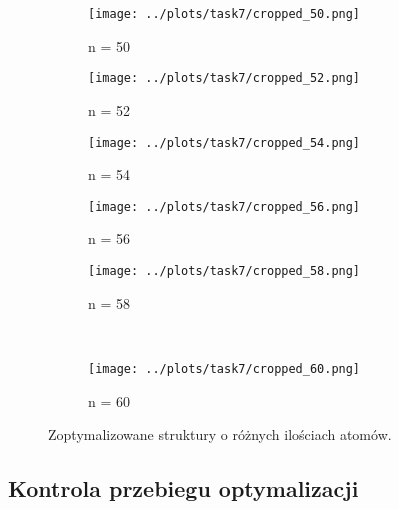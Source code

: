 \documentclass[a4paper,12pt]{article}
\begin{document}
\begin{figure}[H]
\begin{subfigure}{0.19\textwidth}
			\centering 
			\texttt{[image: ../plots/task7/cropped\_50.png]}
			\caption{n = 50}
		\end{subfigure}
		\begin{subfigure}{0.19\textwidth}
			\centering 
			\texttt{[image: ../plots/task7/cropped\_52.png]}
			\caption{n = 52}
		\end{subfigure}
		\begin{subfigure}{0.19\textwidth}
			\centering 
			\texttt{[image: ../plots/task7/cropped\_54.png]}
			\caption{n = 54}
		\end{subfigure}
		\begin{subfigure}{0.19\textwidth}
			\centering 
			\texttt{[image: ../plots/task7/cropped\_56.png]}
			\caption{n = 56}
		\end{subfigure}
		\begin{subfigure}{0.19\textwidth}
			\centering 
			\texttt{[image: ../plots/task7/cropped\_58.png]}
			\caption{n = 58}
		\end{subfigure}
		\\ 
		\begin{subfigure}{0.19\textwidth}
			\centering 
			\texttt{[image: ../plots/task7/cropped\_60.png]}
			\caption{n = 60}
		\end{subfigure}
		\caption{Zoptymalizowane struktury o różnych ilościach atomów.}
		\label{task7_optim}
	\end{figure}
	
	\newpage
	
	\subsection*{Kontrola przebiegu optymalizacji}
	
\end{document}
